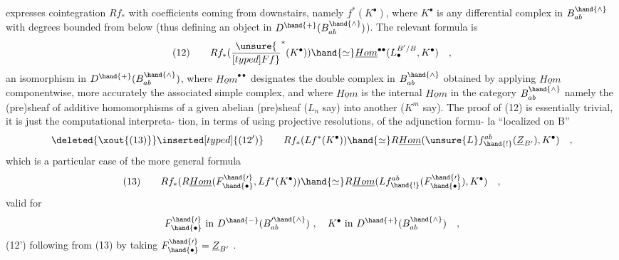
expresses cointegration $Rf_*$ with coefficients 
coming from downstairs, namely $f^*(K^\bullet)$, where $K^\bullet$ is any differential 
complex in $B^\hand{\wedge}_{ab}$ with degrees bounded from below (thus defining an object
in $D^{\hand{+}}(B^\hand{\wedge}_{ab})$). The relevant formula is
\[ (12) \qquad Rf_*(\unsure{\over[typed]{F}{f}}^*(K^\bullet)) \hand{\simeq} \underline{Hom}^{\bullet\bullet}(L_\bullet^{B'/B} , K^\bullet) \quad , \]
an isomorphism in $D^{\hand{+}}(B^\hand{\wedge}_{ab})$, where $\underline{Hom}^{\bullet\bullet}$ designates the double complex
in $B^\hand{\wedge}_{ab}$ obtained by applying $\underline{Hom}$ componentwise, more accurately the
associated simple complex, and where $\underline{Hom}$ is the internal $\underline{Hom}$ in the
category $B^\hand{\wedge}_{ab}$ namely the  (pre)sheaf of additive homomorphisms of
a given abelian (pre)sheaf ($L_n$ say) into another ($K^m$ say). The proof
of (12) is essentially trivial, it is just the computational interpreta-%
tion, in terms of using projective resolutions, of the adjunction formu-%
la ``localized on B''
\[ \deleted{\xout{(13)}}\inserted[typed]{(12')} \qquad Rf_*(Lf^*(K^\bullet)) \hand{\simeq} R\underline{Hom}(\unsure{L}f^{ab}_\hand{!}(\underline{Z}_{B'}), K^\bullet) \quad , \]
which is a particular case of the more general  formula
\[ (13) \qquad Rf_*(R\underline{Hom}(F^{\hand{\prime}}_{\hand{\bullet}} , Lf^*(K^\bullet)) \hand{\simeq} R\underline{Hom}(Lf^{ab}_\hand{!}(F^{\hand{\prime}}_{\hand{\bullet}}), K^\bullet) \quad , \]
valid for
\[ F^{\hand{\prime}}_{\hand{\bullet}} \text{ in } D^{\hand{-}}(B'^\hand{\wedge}_{ab}) \ , \quad K^\bullet \text{ in } D^{\hand{+}}(B^\hand{\wedge}_{ab}) \quad , \]
(12') following from (13) by taking $F^{\hand{\prime}}_{\hand{\bullet}} = \underline{Z}_{B'}$ .


